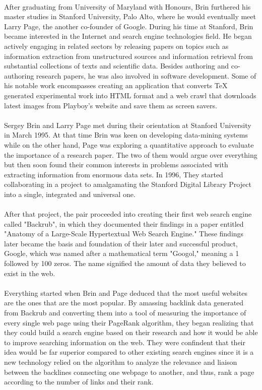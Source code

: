 \documentclass[12pt]{article}
\begin{document}
\paragraph{}
After graduating from University of Maryland with Honours, Brin furthered his master studies in Stanford University, Palo Alto, where he would eventually meet Larry Page, the another co-founder of Google. During his time at Stanford, Brin became interested in the Internet and search engine technologies field. He began actively engaging in related sectors by releasing papers on topics such as information extraction from unstructured sources and information retrieval from substantial collections of texts and scientific data. Besides authoring and co-authoring research papers, he was also involved in software development. Some of his notable work encompasses creating an application that converts TeX generated experimental work into HTML format and a web crawl that downloads latest images from Playboy's website and save them as screen savers.
\paragraph{}
Sergey Brin and Larry Page met during their orientation at Stanford University in March 1995. At that time Brin was keen on developing data-mining systems while on the other hand, Page was exploring a quantitative approach to evaluate the importance of a research paper. The two of them would argue over everything but then soon found their common interests in problems associated with extracting information from enormous data sets. In 1996, They started collaborating in a project to amalgamating the Stanford Digital Library Project into a single, integrated and universal one. 
\paragraph{}
After that project, the pair proceeded into creating their first web search engine called "Backrub", in which they documented their findings in a paper entitled "Anatomy of a Large-Scale Hypertextual Web Search Engine." These findings later became the basis and foundation of their later and successful product, Google, which was named after a mathematical term "Googol," meaning a 1 followed by 100 zeros. The name signified the amount of data they believed to exist in the web.
\paragraph{}
Everything started when Brin and Page deduced that the most useful websites are the ones that are the most popular. By amassing backlink data generated from Backrub and converting them into a tool of measuring the importance of every single web page using their PageRank algorithm, they began realizing that they could build a search engine based on their research and how it would be able to improve searching information on the web. They were confindent that their idea would be far superior compared to other existing search engines since it is a new technology relied on the algorithm to analyze the relevance and liaison between the backlines connecting one webpage to another, and thus, rank a page according to the number of links and their rank.
\end{document}
